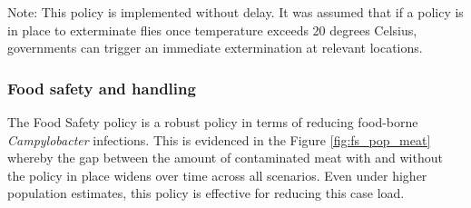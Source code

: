 Note: This policy is implemented without delay. It was assumed that if a policy is in place to exterminate flies once temperature exceeds 20 degrees Celsius, governments can trigger an immediate extermination at relevant locations.

\subsubsection{Food safety and handling}
\label{sec: food safety}
The Food Safety policy is a robust policy in terms of reducing food-borne \textit{Campylobacter} infections. This is evidenced in the Figure \ref{fig:fs_pop_meat}
whereby the gap between the amount of contaminated meat with and without the policy in place widens over time across all scenarios. Even under higher population estimates, this policy is effective for reducing this case load.

